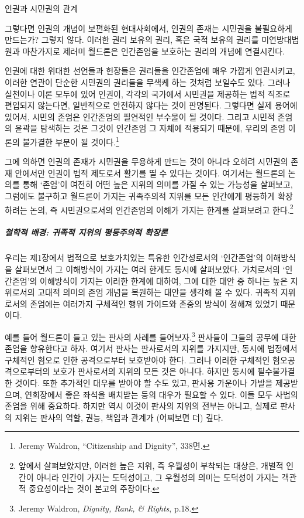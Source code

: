 인권과 시민권의 관계

그렇다면 인권의 개념이 보편화된 현대사회에서, 인권의 존재는 시민권을 불필요하게 만드는가? 그렇지 않다. 이러한 권리 보유의 권리, 혹은 국적 보유의 권리를 미연방대법원과 마찬가지로 제러미 월드론은 인간존엄을 보호하는 권리의 개념에 연결시킨다.

인권에 대한 위대한 선언들과 헌장들은 권리들을 인간존엄에 매우 가깝게 연관시키고, 이러한 연관이 단순한 시민권의 권리들을 무색케 하는 것처럼 보일수도 있다. 그러나 실천이나 이론 모두에 있어 인권이, 각각의 국가에서 시민권을 제공하는 법적 직조로 편입되지 않는다면, 일반적으로 안전하지 않다는 것이 판명된다. 그렇다면 실제 용어에 있어서, 시민의 존엄은 인간존엄의 필연적인 부수물이 될 것이다. 그리고 시민적 존엄의 윤곽을 탐색하는 것은 그것이 인간존엄 그 자체에 적용되기 때문에, 우리의 존엄 이론의 불가결한 부분이 될 것이다.\footnote{Jeremy Waldron, ``Citizenship and Dignity'', 338면.}

그에 의하면 인권의 존재가 시민권을 무용하게 만드는 것이 아니라 오히려 시민권의 존재 안에서만 인권이 법적 제도로서 활기를 띨 수 있다는 것이다. 여기서는 월드론의 논의를 통해 `존엄'이 여전히 어떤 높은 지위의 의미를 가질 수 있는 가능성을 살펴보고, 그럼에도 불구하고 월드론이 가지는 귀족주의적 지위를 모든 인간에게 평등하게 확장하려는 논의, 즉 시민권으로서의 인간존엄의 이해가 가지는 한계를 살펴보려고 한다.\footnote{앞에서 살펴보았지만, 이러한 높은 지위, 즉 우월성이 부착되는 대상은, 개별적 인간이 아니라 인간이 가지는 도덕성이고, 그 우월성의 의미는 도덕성이 가지는 객관적 중요성이라는 것이 본고의 주장이다.}

\subparagraph{\texorpdfstring{철학적 배경: 귀족적 지위의 평등주의적 확장론 }{철학적 배경: 귀족적 지위의 평등주의적 확장론 }}

우리는 제1장에서 법적으로 보호가치있는 특유한 인간성로서의 `인간존엄'의 이해방식을 살펴보면서 그 이해방식이 가지는 여러 한계도 동시에 살펴보았다. 가치로서의 `인간존엄'의 이해방식이 가지는 이러한 한계에 대하여, 그에 대한 대안 중 하나는 높은 지위로서의 고대적 의미의 존엄 개념을 복원하는 대안을 생각해 볼 수 있다. 귀족적 지위로서의 존엄에는 여러가지 구체적인 행위 가이드와 존중의 방식이 정해져 있었기 때문이다.

예를 들어 월드론이 들고 있는 판사의 사례를 들어보자.\footnote{Jeremy Waldron, \emph{Dignity, Rank, \& Rights}, p.18.} 판사들이 그들의 공무에 대한 존엄을 향유한다고 하자. 여기서 판사는 판사로서의 지위를 가지지만, 동시에 법정에서 구체적인 혐오로 인한 공격으로부터 보호받아야 한다. 그러나 이러한 구체적인 혐오공격으로부터의 보호가 판사로서의 지위의 모든 것은 아니다. 하지만 동시에 필수불가결한 것이다. 또한 추가적인 대우를 받아야 할 수도 있고, 판사용 가운이나 가발을 제공받으며, 연회장에서 좋은 좌석을 배치받는 등의 대우가 필요할 수 있다. 이들 모두 사법의 존엄을 위해 중요하다. 하지만 역시 이것이 판사의 지위의 전부는 아니고, 실제로 판사의 지위는 판사의 역할, 권능, 책임과 관계가 (어찌보면 더) 깊다.

